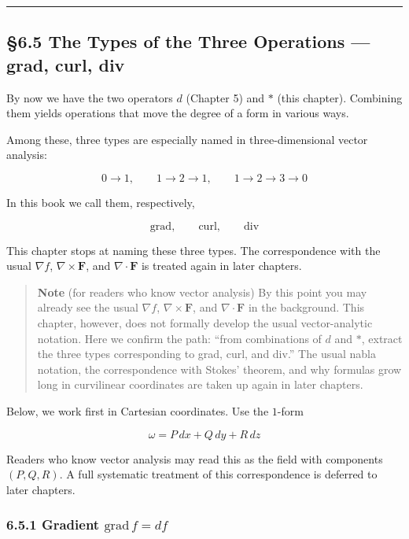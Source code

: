 \begin{center}\rule{0.5\linewidth}{0.5pt}\end{center}

\hypertarget{the-types-of-the-three-operations-grad-curl-div}{%
\subsection{§6.5 The Types of the Three Operations --- grad, curl,
div}\label{the-types-of-the-three-operations-grad-curl-div}}

By now we have the two operators \(d\) (Chapter 5) and \(\ast\) (this
chapter). Combining them yields operations that move the degree of a
form in various ways.

Among these, three types are especially named in three-dimensional
vector analysis:

\[
0 \to 1,\qquad
1 \to 2 \to 1,\qquad
1 \to 2 \to 3 \to 0
\]

In this book we call them, respectively,

\[
\mathrm{grad},\qquad
\mathrm{curl},\qquad
\mathrm{div}
\]

This chapter stops at naming these three types. The correspondence with
the usual \(\nabla f\), \(\nabla\times\mathbf F\), and
\(\nabla\cdot\mathbf F\) is treated again in later chapters.

\begin{quote}
\textbf{Note} (for readers who know vector analysis) By this point you
may already see the usual \(\nabla f\), \(\nabla\times\mathbf F\), and
\(\nabla\cdot\mathbf F\) in the background. This chapter, however, does
not formally develop the usual vector-analytic notation. Here we confirm
the path: ``from combinations of \(d\) and \(\ast\), extract the three
types corresponding to grad, curl, and div.'' The usual nabla notation,
the correspondence with Stokes' theorem, and why formulas grow long in
curvilinear coordinates are taken up again in later chapters.
\end{quote}

Below, we work first in Cartesian coordinates. Use the \(1\)-form

\[
\omega = P\,dx + Q\,dy + R\,dz
\]

Readers who know vector analysis may read this as the field with
components \((P,Q,R)\). A full systematic treatment of this
correspondence is deferred to later chapters.

\hypertarget{gradient-mathrmgradf-df}{%
\subsubsection{\texorpdfstring{6.5.1 Gradient
\(\mathrm{grad}\,f = df\)}{6.5.1 Gradient \textbackslash mathrm\{grad\}\textbackslash,f = df}}\label{gradient-mathrmgradf-df}}

